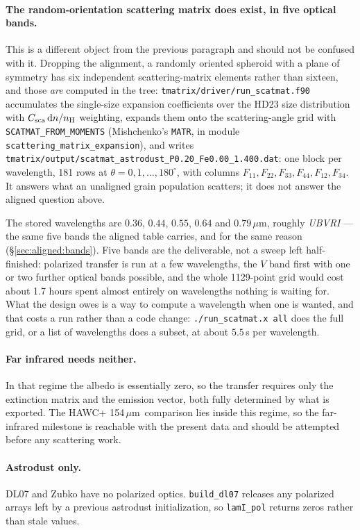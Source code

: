 \documentclass{my_memo}
\newcommand{\code}[1]{\texttt{#1}}
\newcommand{\um}{\ensuremath{\,\mu\mathrm{m}}}
\begin{document}
\paragraph{The random-orientation scattering matrix does exist, in five optical
bands.} This is a different object from the previous paragraph and should not be
confused with it. Dropping the alignment, a randomly oriented spheroid with a
plane of symmetry has six independent scattering-matrix elements rather than
sixteen, and those \emph{are} computed in the tree:
\code{tmatrix/driver/run\_scatmat.f90} accumulates the single-size expansion
coefficients over the HD23 size distribution with $C_{\rm sca}\,{\rm
d}n/n_{\rm H}$ weighting, expands them onto the scattering-angle grid with
\code{SCATMAT\_FROM\_MOMENTS} (Mishchenko's \code{MATR}, in module
\code{scattering\_matrix\_expansion}), and writes
\code{tmatrix/output/scatmat\_astrodust\_P0.20\_Fe0.00\_1.400.dat}: one block per
wavelength, 181 rows at $\theta = 0, 1, \ldots, 180^\circ$, with columns
$F_{11}, F_{22}, F_{33}, F_{44}, F_{12}, F_{34}$. It answers what an unaligned
grain population scatters; it does not answer the aligned question above.

The stored wavelengths are $0.36$, $0.44$, $0.55$, $0.64$ and $0.79\um$, roughly
\textit{UBVRI} --- the same five bands the aligned table carries, and for the same
reason (\S\ref{sec:aligned:bands}). Five bands are the deliverable, not a sweep
left half-finished: polarized transfer is run at a few wavelengths, the $V$ band
first with one or two further optical bands possible, and the whole 1129-point
grid would cost about 1.7 hours spent almost entirely on wavelengths nothing is
waiting for. What the design owes is a way to compute a wavelength when one is
wanted, and that costs a run rather than a code change:
\code{./run\_scatmat.x all} does the full grid, or a list of wavelengths does a
subset, at about $5.5\,$s per wavelength.

\paragraph{Far infrared needs neither.} In that regime the albedo is
essentially zero, so the transfer requires only the extinction matrix and the
emission vector, both fully determined by what is exported. The HAWC+ 154\um\
comparison lies inside this regime, so the far-infrared milestone is reachable
with the present data and should be attempted before any scattering work.

\paragraph{Astrodust only.} DL07 and Zubko have no polarized optics.
\code{build\_dl07} releases any polarized arrays left by a previous astrodust
initialization, so \code{lamI\_pol} returns zeros rather than stale values.
\end{document}
